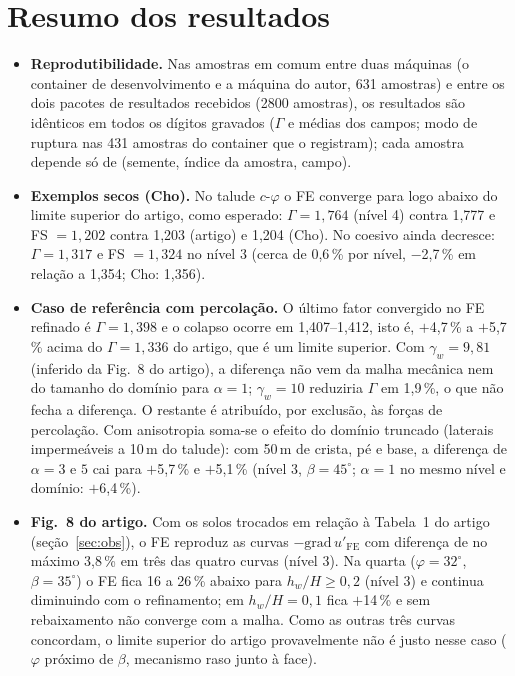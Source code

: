\documentclass[11pt,a4paper]{article}
\newcommand{\Gam}{\Gamma}
\newcommand{\gradu}{-\mathrm{grad}\,u'_{\mathrm{FE}}}
\begin{document}
\section{Resumo dos resultados}
\begin{itemize}
\item \textbf{Reprodutibilidade.} Nas amostras em comum entre duas máquinas (o container de desenvolvimento e a máquina do autor, 631 amostras) e entre os dois pacotes de resultados recebidos (2800 amostras), os resultados são idênticos em todos os dígitos gravados ($\Gam$ e médias dos campos; modo de ruptura nas 431 amostras do container que o registram); cada amostra depende só de (semente, índice da amostra, campo).
\item \textbf{Exemplos secos (Cho).} No talude $c$-$\varphi$ o FE converge para logo abaixo do limite superior do artigo, como esperado: $\Gam = 1{,}764$ (nível 4) contra 1,777 e FS $= 1{,}202$ contra 1,203 (artigo) e 1,204 (Cho). No coesivo ainda decresce: $\Gam = 1{,}317$ e FS $= 1{,}324$ no nível 3 (cerca de 0,6\,\% por nível, $-$2{,}7\,\% em relação a 1,354; Cho: 1,356).
\item \textbf{Caso de referência com percolação.} O último fator convergido no FE refinado é $\Gam = 1{,}398$ e o colapso ocorre em 1{,}407--1{,}412, isto é, $+$4{,}7\,\% a $+$5{,}7\,\% acima do $\Gam = 1{,}336$ do artigo, que é um limite superior. Com $\gamma_w = 9{,}81$ (inferido da Fig.~8 do artigo), a diferença não vem da malha mecânica nem do tamanho do domínio para $\alpha = 1$; $\gamma_w = 10$ reduziria $\Gam$ em 1{,}9\,\%, o que não fecha a diferença. O restante é atribuído, por exclusão, às forças de percolação. Com anisotropia soma-se o efeito do domínio truncado (laterais impermeáveis a 10\,m do talude): com 50\,m de crista, pé e base, a diferença de $\alpha = 3$ e $5$ cai para $+$5{,}7\,\% e $+$5{,}1\,\% (nível 3, $\beta = 45^\circ$; $\alpha = 1$ no mesmo nível e domínio: $+$6{,}4\,\%).
\item \textbf{Fig.~8 do artigo.} Com os solos trocados em relação à Tabela~1 do artigo (seção~\ref{sec:obs}), o FE reproduz as curvas ${\gradu}$ com diferença de no máximo 3{,}8\,\% em três das quatro curvas (nível 3). Na quarta ($\varphi = 32^\circ$, $\beta = 35^\circ$) o FE fica 16 a 26\,\% abaixo para $h_w/H \ge 0{,}2$ (nível 3) e continua diminuindo com o refinamento; em $h_w/H = 0{,}1$ fica $+$14\,\% e sem rebaixamento não converge com a malha. Como as outras três curvas concordam, o limite superior do artigo provavelmente não é justo nesse caso ($\varphi$ próximo de $\beta$, mecanismo raso junto à face).

\end{itemize}
\end{document}
